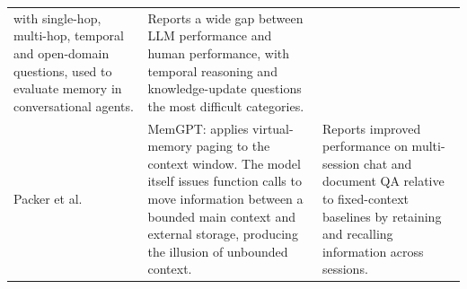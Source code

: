 \documentclass[11pt,a4paper]{article}
\begin{document}
\begin{table}[htbp]
\begin{tabularx}{\textwidth}{p{2.6cm} X p{3.5cm}}
with single-hop, multi-hop, temporal and open-domain questions, used to
evaluate memory in conversational agents. &
Reports a wide gap between LLM performance and human performance, with temporal
reasoning and knowledge-update questions the most difficult categories.\\
\addlinespace
Packer et al.~\cite{packer2023memgpt}\footnotemark[5] &
MemGPT: applies virtual-memory paging to the context window. The model itself
issues function calls to move information between a bounded main context and
external storage, producing the illusion of unbounded context. &
Reports improved performance on multi-session chat and document QA relative to
fixed-context baselines by retaining and recalling information across
sessions.\\
\bottomrule
\end{tabularx}
\end{table}
\end{document}
